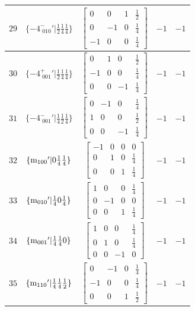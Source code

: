 \documentclass[fleqn,8pt]{jsarticle}
\begin{document}
\begin{longtable}{ccccc}
$ 29 $ & $ \{-4^{-}_{\,\,010}{}'|\frac{1}{2} \frac{1}{4} \frac{1}{4}\} $ & $ \begin{bmatrix} 0 & 0 & 1 & \frac{1}{2} \\ 0 & -1 & 0 & \frac{1}{4} \\ -1 & 0 & 0 & \frac{1}{4} \end{bmatrix} $ & $ -1 $ & $ -1 $ \\ \hline
$ 30 $ & $ \{-4^{+}_{\,\,001}{}'|\frac{1}{2} \frac{1}{4} \frac{1}{4}\} $ & $ \begin{bmatrix} 0 & 1 & 0 & \frac{1}{2} \\ -1 & 0 & 0 & \frac{1}{4} \\ 0 & 0 & -1 & \frac{1}{4} \end{bmatrix} $ & $ -1 $ & $ -1 $ \\ \hline
$ 31 $ & $ \{-4^{-}_{\,\,001}{}'|\frac{1}{4} \frac{1}{2} \frac{1}{4}\} $ & $ \begin{bmatrix} 0 & -1 & 0 & \frac{1}{4} \\ 1 & 0 & 0 & \frac{1}{2} \\ 0 & 0 & -1 & \frac{1}{4} \end{bmatrix} $ & $ -1 $ & $ -1 $ \\ \hline
$ 32 $ & $ \{{\rm m}_{100}{}'|0 \frac{1}{4} \frac{1}{4}\} $ & $ \begin{bmatrix} -1 & 0 & 0 & 0 \\ 0 & 1 & 0 & \frac{1}{4} \\ 0 & 0 & 1 & \frac{1}{4} \end{bmatrix} $ & $ -1 $ & $ -1 $ \\ \hline
$ 33 $ & $ \{{\rm m}_{010}{}'|\frac{1}{4} 0 \frac{1}{4}\} $ & $ \begin{bmatrix} 1 & 0 & 0 & \frac{1}{4} \\ 0 & -1 & 0 & 0 \\ 0 & 0 & 1 & \frac{1}{4} \end{bmatrix} $ & $ -1 $ & $ -1 $ \\ \hline
$ 34 $ & $ \{{\rm m}_{001}{}'|\frac{1}{4} \frac{1}{4} 0\} $ & $ \begin{bmatrix} 1 & 0 & 0 & \frac{1}{4} \\ 0 & 1 & 0 & \frac{1}{4} \\ 0 & 0 & -1 & 0 \end{bmatrix} $ & $ -1 $ & $ -1 $ \\ \hline
$ 35 $ & $ \{{\rm m}_{110}{}'|\frac{1}{4} \frac{1}{4} \frac{1}{2}\} $ & $ \begin{bmatrix} 0 & -1 & 0 & \frac{1}{4} \\ -1 & 0 & 0 & \frac{1}{4} \\ 0 & 0 & 1 & \frac{1}{2} \end{bmatrix} $ & $ -1 $ & $ -1 $ \\ \hline

\end{longtable}
\end{document}
